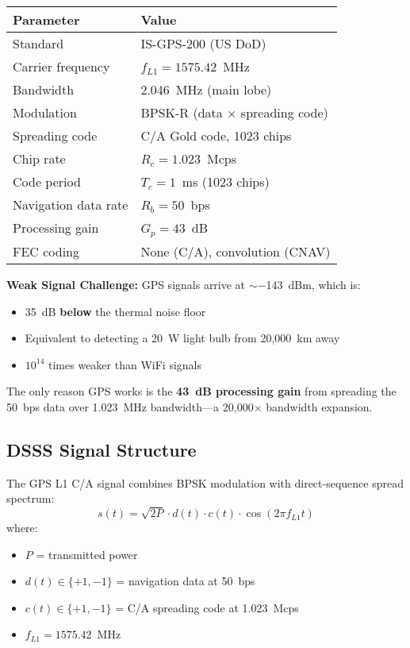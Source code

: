 \begin{tabular}{@{}ll@{}}
\toprule
\textbf{Parameter} & \textbf{Value} \\
\midrule
Standard & IS-GPS-200 (US DoD) \\
Carrier frequency & $f_{L1} = 1575.42$~MHz \\
Bandwidth & 2.046~MHz (main lobe) \\
Modulation & BPSK-R (data $\times$ spreading code) \\
Spreading code & C/A Gold code, 1023 chips \\
Chip rate & $R_c = 1.023$~Mcps \\
Code period & $T_c = 1$~ms (1023 chips) \\
Navigation data rate & $R_b = 50$~bps \\
Processing gain & $G_p = 43$~dB \\
FEC coding & None (C/A), convolution (CNAV) \\
\bottomrule
\end{tabular}

\begin{warningbox}
\textbf{Weak Signal Challenge:} GPS signals arrive at $\sim$$-$143~dBm, which is:
\begin{itemize}
\item 35~dB \textbf{below} the thermal noise floor
\item Equivalent to detecting a 20~W light bulb from 20,000~km away
\item $10^{14}$ times weaker than WiFi signals
\end{itemize}

The only reason GPS works is the \textbf{43~dB processing gain} from spreading the 50~bps data over 1.023~MHz bandwidth---a 20,000$\times$ bandwidth expansion.
\end{warningbox}

\subsection{DSSS Signal Structure}

The GPS L1 C/A signal combines BPSK modulation with direct-sequence spread spectrum:
\begin{equation}
s(t) = \sqrt{2P} \cdot d(t) \cdot c(t) \cdot \cos(2\pi f_{L1} t)
\end{equation}
where:
\begin{itemize}
\item $P$ = transmitted power
\item $d(t) \in \{+1, -1\}$ = navigation data at 50~bps
\item $c(t) \in \{+1, -1\}$ = C/A spreading code at 1.023~Mcps
\item $f_{L1} = 1575.42$~MHz
\end{itemize}

